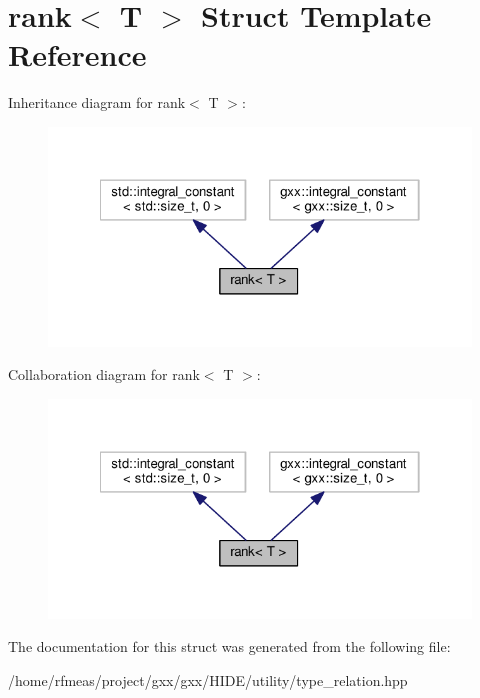\hypertarget{structrank}{}\section{rank$<$ T $>$ Struct Template Reference}
\label{structrank}


Inheritance diagram for rank$<$ T $>$\+:
\nopagebreak
\begin{figure}[H]
\begin{center}
\leavevmode
\includegraphics[width=322pt]{structrank__inherit__graph}
\end{center}
\end{figure}


Collaboration diagram for rank$<$ T $>$\+:
\nopagebreak
\begin{figure}[H]
\begin{center}
\leavevmode
\includegraphics[width=322pt]{structrank__coll__graph}
\end{center}
\end{figure}


The documentation for this struct was generated from the following file\+:\begin{DoxyCompactItemize}
\item 
/home/rfmeas/project/gxx/gxx/\+H\+I\+D\+E/utility/type\+\_\+relation.\+hpp\end{DoxyCompactItemize}
